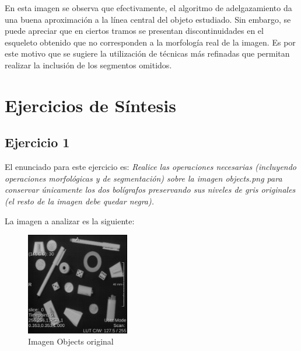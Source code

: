 \documentclass{article}
\begin{document}
En esta imagen se observa que efectivamente, el algoritmo de adelgazamiento da una buena aproximaci\'{o}n a la l\'{i}nea central del objeto estudiado. Sin embargo, se puede apreciar que en ciertos tramos se presentan discontinuidades en el esqueleto obtenido que no corresponden a la morfolog\'{i}a real de la imagen. Es por este motivo que se sugiere la utilizaci\'{o}n de t\'{e}cnicas m\'{a}s refinadas que permitan realizar la inclusi\'{o}n de los segmentos omitidos.





\section{Ejercicios de S\'{i}ntesis}
\label{sec:sintesis}

\subsection{Ejercicio 1}
\begin{par}
El enunciado para este ejercicio es: \textit{Realice las operaciones necesarias
(incluyendo operaciones morfol\'{o}gicas y de segmentaci\'{o}n) sobre la imagen objects.png para
conservar \'{u}nicamente los dos bol\'{i}grafos preservando sus niveles de gris originales (el
resto de la imagen debe quedar negra).}
\end{par}
La imagen a analizar es la siguiente: 

\begin{figure}[ht]
\begin{center}
\includegraphics[width=0.4\textwidth]{4Sintesis/4_1_orig} %
\caption{Imagen Objects original}
\label{fg:4_1_orig}
\end{center}
\end{figure}
\FloatBarrier
\end{document}
